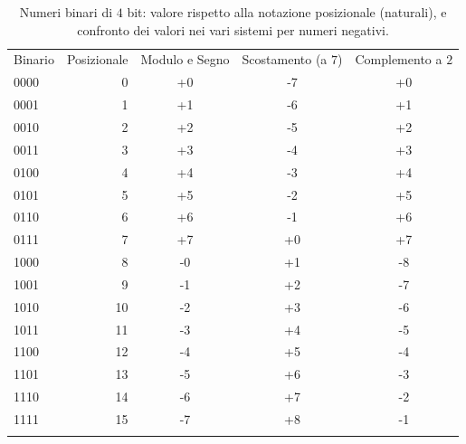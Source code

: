 \begin{table}\sffamily\centering
\renewcommand{\arraystretch}{1.2}
\begin{tabular}{l|rccc}
Binario & Posizionale & Modulo e Segno & Scostamento (a $7$) & Complemento a $2$ \\ 
0000 &  0 & +0  & -7 & +0 \\
0001 &  1 & +1  & -6 & +1 \\
0010 &  2 & +2  & -5 & +2 \\
0011 &  3 & +3  & -4 & +3 \\
0100 &  4 & +4  & -3 & +4 \\
0101 &  5 & +5  & -2 & +5 \\
0110 &  6 & +6  & -1 & +6 \\
0111 &  7 & +7  & +0 & +7 \\
1000 &  8 & -0  & +1 & -8 \\
1001 &  9 & -1  & +2 & -7 \\
1010 & 10 & -2  & +3 & -6 \\
1011 & 11 & -3  & +4 & -5 \\
1100 & 12 & -4  & +5 & -4 \\
1101 & 13 & -5  & +6 & -3 \\
1110 & 14 & -6  & +7 & -2 \\
1111 & 15 & -7  & +8 & -1 \\
 \hline\noalign{\smallskip}
\end{tabular}
\caption{Numeri binari di $4$ bit: valore rispetto alla notazione posizionale (naturali), e confronto dei valori nei vari sistemi per numeri negativi.}
\label{tab:zeta}
\end{table}

